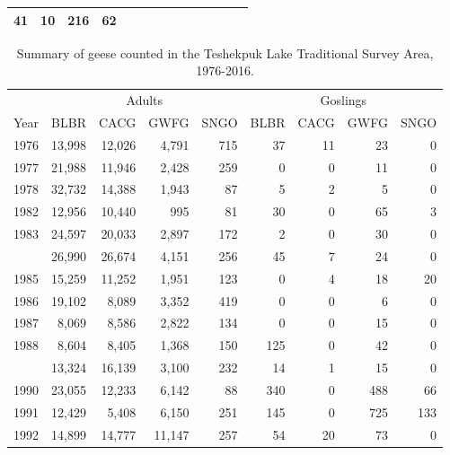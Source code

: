 \documentclass[]{article}
\begin{document}
{\begin{longtable}[]{@{}rrrrrrrrrrrrrr@{}}
\begin{minipage}[t]{0.04\columnwidth}
41\strut
\end{minipage} & \begin{minipage}[t]{0.04\columnwidth}\raggedleft\strut
10\strut
\end{minipage} & \begin{minipage}[t]{0.04\columnwidth}\raggedleft\strut
216\strut
\end{minipage} & \begin{minipage}[t]{0.04\columnwidth}\raggedleft\strut
62\strut
\end{minipage}\tabularnewline
\bottomrule
\end{longtable}
}%
\begin{table}

\caption{\label{tab:Kable_76_17}Summary of geese counted in the Teshekpuk Lake Traditional Survey Area, 1976-2016.}
\centering
\begin{tabular}[t]{lrrrrrrrr}
\toprule
\multicolumn{1}{c}{} & \multicolumn{4}{c}{Adults} & \multicolumn{4}{c}{Goslings} \\
\cmidrule(l{2pt}r{2pt}){2-5} \cmidrule(l{2pt}r{2pt}){6-9}
Year & BLBR & CACG & GWFG & SNGO & BLBR & CACG & GWFG & SNGO\\
\midrule
1976 & 13,998 & 12,026 & 4,791 & 715 & 37 & 11 & 23 & 0\\
1977 & 21,988 & 11,946 & 2,428 & 259 & 0 & 0 & 11 & 0\\
1978 & 32,732 & 14,388 & 1,943 & 87 & 5 & 2 & 5 & 0\\
1982 & 12,956 & 10,440 & 995 & 81 & 30 & 0 & 65 & 3\\
1983 & 24,597 & 20,033 & 2,897 & 172 & 2 & 0 & 30 & 0\\
\addlinespace
1984 & 26,990 & 26,674 & 4,151 & 256 & 45 & 7 & 24 & 0\\
1985 & 15,259 & 11,252 & 1,951 & 123 & 0 & 4 & 18 & 20\\
1986 & 19,102 & 8,089 & 3,352 & 419 & 0 & 0 & 6 & 0\\
1987 & 8,069 & 8,586 & 2,822 & 134 & 0 & 0 & 15 & 0\\
1988 & 8,604 & 8,405 & 1,368 & 150 & 125 & 0 & 42 & 0\\
\addlinespace
1989 & 13,324 & 16,139 & 3,100 & 232 & 14 & 1 & 15 & 0\\
1990 & 23,055 & 12,233 & 6,142 & 88 & 340 & 0 & 488 & 66\\
1991 & 12,429 & 5,408 & 6,150 & 251 & 145 & 0 & 725 & 133\\
1992 & 14,899 & 14,777 & 11,147 & 257 & 54 & 20 & 73 & 0\\

\end{tabular}
\end{table}
\end{document}
